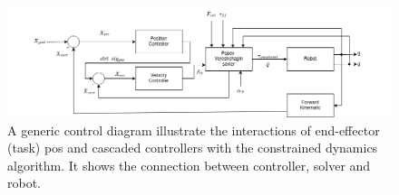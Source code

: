 \documentclass[report.tex]{subfiles}
\begin{document}
    \begin{figure}[h]
        \centering
        \includegraphics[width=1\linewidth]{images/systemdia.png}
        \caption{A generic control diagram illustrate the interactions of end-effector (task)
        pos and cascaded controllers with the constrained dynamics
        algorithm. It shows the connection between controller, solver and robot.}
        \label{fig:sys}
    \end{figure}
\end{document}
